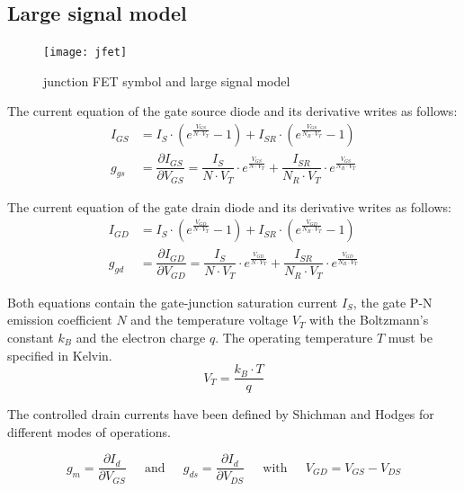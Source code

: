 \documentclass[10pt]{report}
\begin{document}
\addvspace{12pt}

\subsection{Large signal model}

\begin{figure}[ht]
\begin{center}
\texttt{[image: jfet]}
\end{center}
\caption{junction FET symbol and large signal model}
\label{fig:jfet}
\end{figure}
\FloatBarrier

The current equation of the gate source diode and its derivative
writes as follows:
\begin{align}
I_{GS} &= I_{S}\cdot \left(e^{\frac{V_{GS}}{N\cdot V_{T}}} - 1\right) + I_{SR}\cdot \left(e^{\frac{V_{GS}}{N_{R}\cdot V_{T}}} - 1\right)\\
g_{gs} &= \dfrac{\partial I_{GS}}{\partial V_{GS}} = \dfrac{I_{S}}{N\cdot V_{T}}\cdot e^{\frac{V_{GS}}{N\cdot V_{T}}} + \dfrac{I_{SR}}{N_{R}\cdot V_{T}}\cdot e^{\frac{V_{GS}}{N_{R}\cdot V_{T}}}
\end{align}

The current equation of the gate drain diode and its derivative writes
as follows:
\begin{align}
I_{GD} &= I_{S}\cdot \left(e^{\frac{V_{GD}}{N\cdot V_{T}}} - 1\right) + I_{SR}\cdot \left(e^{\frac{V_{GD}}{N_{R}\cdot V_{T}}} - 1\right)\\
g_{gd} &= \dfrac{\partial I_{GD}}{\partial V_{GD}} = \dfrac{I_{S}}{N\cdot V_{T}}\cdot e^{\frac{V_{GD}}{N\cdot V_{T}}} + \dfrac{I_{SR}}{N_{R}\cdot V_{T}}\cdot e^{\frac{V_{GD}}{N_{R}\cdot V_{T}}}
\end{align}

Both equations contain the gate-junction saturation current $I_{S}$,
the gate P-N emission coefficient $N$ and the temperature voltage
$V_{T}$ with the Boltzmann's constant $k_{B}$ and the electron charge
$q$.  The operating temperature $T$ must be specified in Kelvin.
\begin{equation}
V_{T} = \dfrac{k_{B}\cdot T}{q}
\end{equation}

The controlled drain currents have been defined by Shichman and Hodges
\cite{Shichman} for different modes of operations.

\begin{equation}
g_{m} = \dfrac{\partial I_{d}}{\partial V_{GS}}
\;\;\;\; \text{ and } \;\;\;\;
g_{ds} = \dfrac{\partial I_{d}}{\partial V_{DS}}
\;\;\;\; \text{ with } \;\;\;\;
V_{GD} = V_{GS} - V_{DS}
\end{equation}
\end{document}

